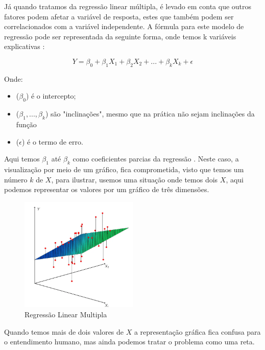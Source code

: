 \documentclass[
	12pt,				%
	openright,			%
	oneside,			%
	a4paper,			%
	english,			%
	brazil				%
	]{abntex2}
\begin{document}
Já quando tratamos da regressão linear múltipla, é levado em conta que outros fatores podem afetar a 
variável de resposta, estes que também podem ser correlacionados com a variável independente. A fórmula 
para este modelo de regressão pode ser representada da seguinte forma, onde temos k variáveis 
explicativas \cite{modelos_regressao_linear}:

\begin{equation}
	\label{rq_reg_multipla}
	Y = \beta_0 + \beta_1X_1 + \beta_2X_2 + ... + \beta_kX_k + \epsilon
\end{equation}

Onde:
\begin{itemize}
	\item ($\beta_0$) é o intercepto;
	\item ($\beta_1,...,\beta_k$) são "inclinações", mesmo que na prática não sejam inclinações da função
	\item ($\epsilon$) é o termo de erro.
\end{itemize}

Aqui temos $\beta_1$ até $\beta_k$ como coeficientes parcias da regressão \cite{modelos_regressao_linear}. 
Neste caso, a visualização por meio de um gráfico, fica comprometida, visto que temos um número $k$ de 
$X$, para ilustrar, usemos uma situação onde temos dois $X$, aqui podemos representar os valores por 
um gráfico de três dimensões.

\begin{figure}[H]
    \centering
    \caption{\label{Regressão Linear Multipla}Regressão Linear Multipla}
    \includegraphics[width=0.50\textwidth]{../Imgs/reg_linear_multipla.png}
\end{figure}

Quando temos mais de dois valores de $X$ a representação gráfica fica confusa para o entendimento humano,
mas ainda podemos tratar o problema como uma reta.
\end{document}
